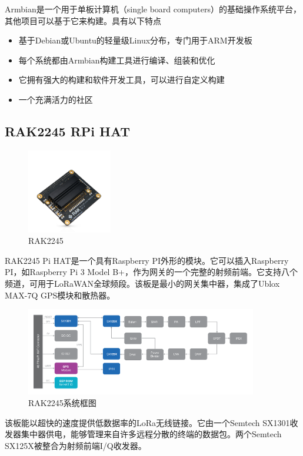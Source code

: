 \documentclass[scheme=chinese,a4paper]{article}
\begin{document}
Armbian是一个用于单板计算机（single board computers）的基础操作系统平台，其他项目可以基于它来构建。具有以下特点
\begin{itemize}
  \item 基于Debian或Ubuntu的轻量级Linux分布，专门用于ARM开发板
  \item 每个系统都由Armbian构建工具进行编译、组装和优化
  \item 它拥有强大的构建和软件开发工具，可以进行自定义构建
  \item 一个充满活力的社区
\end{itemize}

\subsection{RAK2245 RPi HAT}
\begin{figure}[H]
\centering
\includegraphics[width=0.33\textwidth]{rak2245.png}
\caption{RAK2245}
\end{figure}
RAK2245 Pi HAT是一个具有Raspberry PI外形的模块。它可以插入Raspberry PI，如Raspberry Pi 3 Model B+，作为网关的一个完整的射频前端。它支持八个频道，可用于LoRaWAN全球频段。该板是最小的网关集中器，集成了Ublox MAX-7Q GPS模块和散热器。
\begin{figure}[H]
\centering
\includegraphics[width=0.9\textwidth]{rak2245-pihat-block-diagram.png}
\caption{RAK2245系统框图}
\end{figure}
该板能以超快的速度提供低数据率的LoRa无线链接。它由一个Semtech SX1301收发器集中器供电，能够管理来自许多远程分散的终端的数据包。两个Semtech SX125X被整合为射频前端I/Q收发器。
\end{document}
